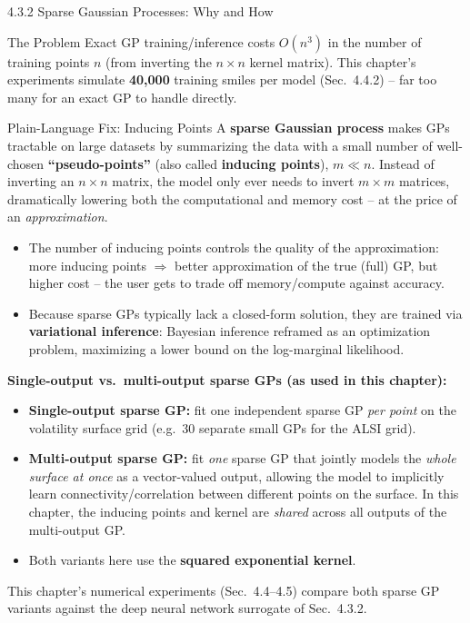 \documentclass[aspectratio=169,10pt]{beamer}
\begin{document}
\begin{frame}[allowframebreaks]{4.3.2 Sparse Gaussian Processes: Why and How}

\begin{block}{The Problem}
Exact GP training/inference costs $O(n^3)$ in the number of training
points $n$ (from inverting the $n\times n$ kernel matrix). This chapter's
experiments simulate \textbf{40{,}000} training smiles per model
(Sec.\ 4.4.2) -- far too many for an exact GP to handle directly.
\end{block}

\begin{block}{Plain-Language Fix: Inducing Points}
A \textbf{sparse Gaussian process} makes GPs tractable on large datasets
by summarizing the data with a small number of well-chosen
\textbf{``pseudo-points''} (also called \textbf{inducing points}),
$m \ll n$. Instead of inverting an $n\times n$ matrix, the model only ever
needs to invert $m\times m$ matrices, dramatically lowering both the
computational and memory cost -- at the price of an
\emph{approximation}.
\end{block}

\begin{itemize}
  \item The number of inducing points controls the quality of the
        approximation: more inducing points $\Rightarrow$ better
        approximation of the true (full) GP, but higher cost -- the user
        gets to trade off memory/compute against accuracy.
  \item Because sparse GPs typically lack a closed-form solution, they
        are trained via \textbf{variational inference}: Bayesian
        inference reframed as an optimization problem, maximizing a
        lower bound on the log-marginal likelihood.
\end{itemize}

\framebreak

\textbf{Single-output vs.\ multi-output sparse GPs (as used in this
chapter):}
\begin{itemize}
  \item \textbf{Single-output sparse GP:} fit one independent sparse GP
        \emph{per point} on the volatility surface grid (e.g.\ 30
        separate small GPs for the ALSI grid).
  \item \textbf{Multi-output sparse GP:} fit \emph{one} sparse GP that
        jointly models the \emph{whole surface at once} as a
        vector-valued output, allowing the model to implicitly learn
        connectivity/correlation between different points on the
        surface. In this chapter, the inducing points and kernel are
        \emph{shared} across all outputs of the multi-output GP.
  \item Both variants here use the \textbf{squared exponential kernel}.
\end{itemize}

This chapter's numerical experiments (Sec.\ 4.4--4.5) compare both sparse
GP variants against the deep neural network surrogate of Sec.\ 4.3.2.

\end{frame}
\end{document}
